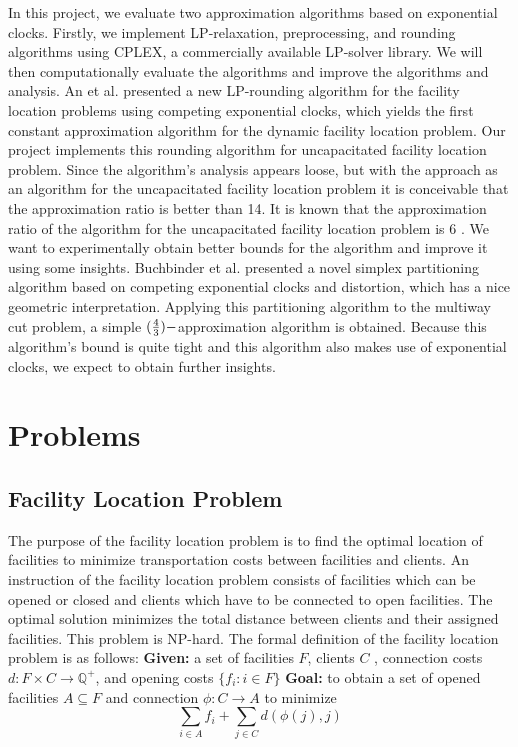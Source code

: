 \documentclass[a4paper]{article}
\begin{document}
\newline
\indent
In this project, we evaluate two approximation algorithms based on exponential clocks. Firstly, we implement LP-relaxation, preprocessing, and rounding algorithms using CPLEX, a commercially available LP-solver library. We will then computationally evaluate the algorithms and improve the algorithms and analysis.
\newline
\indent
An et al. \cite{an2015dynamic} presented a new LP-rounding algorithm for the facility location problems using competing exponential clocks, which yields the first constant approximation algorithm for the dynamic facility location problem. Our project implements this rounding algorithm for uncapacitated facility location problem. Since the algorithm's analysis appears loose, but with the approach as an algorithm for the uncapacitated facility location problem it is conceivable that the approximation ratio is better than 14. It is known that the approximation ratio of the algorithm for the uncapacitated facility location problem is 6 \cite{an2015dynamic}. We want to experimentally obtain better bounds for the algorithm and improve it using some insights.
\newline\indent
 Buchbinder et al. \cite{buchbinder2013simplex} presented a novel simplex partitioning algorithm based on competing exponential clocks and distortion, which has a nice geometric interpretation. Applying this partitioning algorithm to the multiway cut problem, a simple $({4 \over 3})-$approximation algorithm is obtained. Because this algorithm's bound is quite tight and this algorithm also makes use of exponential clocks, we expect to obtain further insights.

\section{Problems}
\subsection{Facility Location Problem}
The purpose of the facility location problem is to find the optimal location of facilities to minimize transportation costs between facilities and clients. An instruction of the facility location problem consists of facilities which can be opened or closed and clients which have to be connected to open facilities. The optimal solution minimizes the total distance between clients and their assigned facilities. This problem is NP-hard. The formal definition of the facility location problem is as follows:
\newline
\indent \textbf{Given:} a set of facilities $F$, clients $C$ , connection costs $d:F\times C\rightarrow \mathbb{Q^+}$, and opening costs $\{f_{i}:i\in F\} $ 
\newline 
\indent \textbf{Goal:} to obtain a set of opened facilities $A\subseteq F$ and connection $\phi : C \rightarrow A$ to minimize 
\newline 
$$\sum\limits_{i\in A} f_{i} + \sum\limits_{j\in C} d(\phi (j), j)$$
\end{document}
